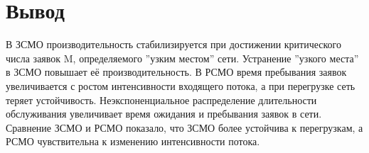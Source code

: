 \documentclass{article}
\begin{document}
\section{Вывод}

В ЗСМО производительность стабилизируется при достижении критического числа заявок M, определяемого ''узким местом'' сети. Устранение ''узкого места'' в ЗСМО повышает её производительность. В РСМО время пребывания заявок увеличивается с ростом интенсивности входящего потока, а при перегрузке сеть теряет устойчивость. Неэкспоненциальное распределение длительности обслуживания увеличивает время ожидания и пребывания заявок в сети. Сравнение ЗСМО и РСМО показало, что ЗСМО более устойчива к перегрузкам, а РСМО чувствительна к изменению интенсивности потока.
\end{document}
